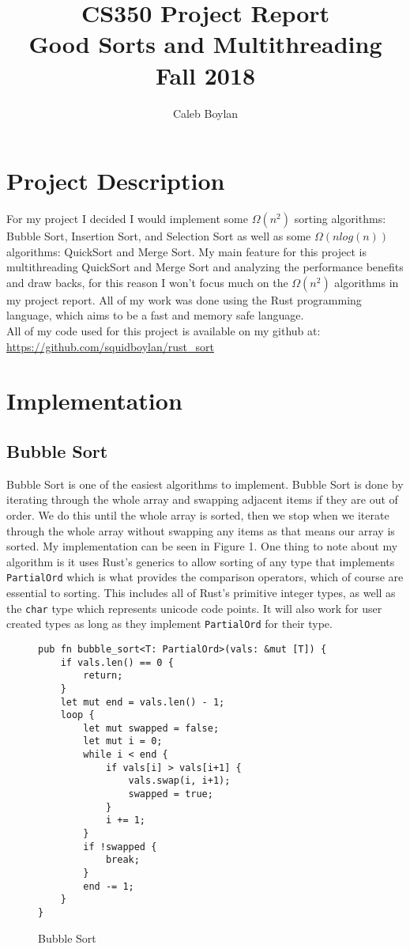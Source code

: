 \documentclass[12pt,letterpaper]{report}
\author{Caleb Boylan}
\title{CS350 Project Report\\ Good Sorts and Multithreading\\ Fall 2018}
\date{}
\newcommand{\rust}[1]{\texttt{#1}}
\begin{document}
\maketitle

	\section*{Project Description}

	For my project I decided I would implement some $\Omega(n^2)$ sorting algorithms: Bubble Sort, Insertion Sort, and Selection Sort as well as some $\Omega(nlog(n))$ algorithms: QuickSort and Merge Sort. My main feature for this project is multithreading QuickSort and Merge Sort and analyzing the performance benefits and draw backs, for this reason I won't focus much on the $\Omega(n^2)$ algorithms in my project report. All of my work was done using the Rust programming language, which aims to be a fast and memory safe language.\\
	
	All of my code used for this project is available on my github at:\\ \url{https://github.com/squidboylan/rust_sort}

	\section*{Implementation}
	
	\subsection*{Bubble Sort}
	
	Bubble Sort\cite{bubble_sort} is one of the easiest algorithms to implement. Bubble Sort is done by iterating through the whole array and swapping adjacent items if they are out of order. We do this until the whole array is sorted, then we stop when we iterate through the whole array without swapping any items as that means our array is sorted. My implementation can be seen in Figure 1.  One thing to note about my algorithm is it uses Rust's generics to allow sorting of any type that implements \rust{PartialOrd} which is what provides the comparison operators, which of course are essential to sorting. This includes all of Rust's primitive integer types, as well as the \rust{char} type which represents unicode code points. It will also work for user created types as long as they implement \rust{PartialOrd} for their type.
	
	\begin{figure}[H]
	\begin{verbatim}
pub fn bubble_sort<T: PartialOrd>(vals: &mut [T]) {
    if vals.len() == 0 {
        return;
    }
    let mut end = vals.len() - 1;
    loop {
        let mut swapped = false;
        let mut i = 0;
        while i < end {
            if vals[i] > vals[i+1] {
                vals.swap(i, i+1);
                swapped = true;
            }
            i += 1;
        }
        if !swapped {
            break;
        }
        end -= 1;
    }
}
    \end{verbatim}
    \caption{Bubble Sort}
\end{figure}
\end{document}
